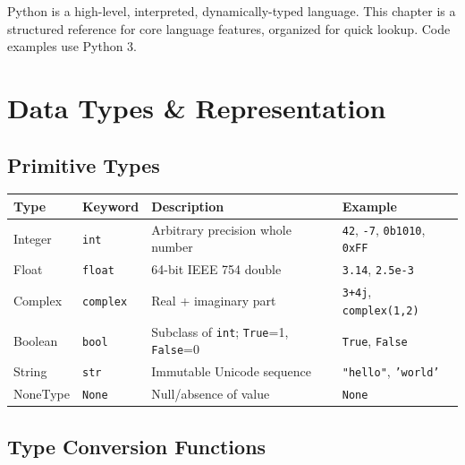 \documentclass[oneside]{book}
\begin{document}
Python is a high-level, interpreted, dynamically-typed language. This chapter
is a structured reference for core language features, organized for quick
lookup. Code examples use Python 3.

\section{Data Types \& Representation}

\subsection*{Primitive Types}

\begin{center}
\begin{tabularx}{\linewidth}{llXl}
\toprule
\textbf{Type} & \textbf{Keyword} & \textbf{Description} & \textbf{Example} \\
\midrule
Integer    & \texttt{int}     & Arbitrary precision whole number       & \texttt{42}, \texttt{-7}, \texttt{0b1010}, \texttt{0xFF} \\
Float      & \texttt{float}   & 64-bit IEEE 754 double                 & \texttt{3.14}, \texttt{2.5e-3} \\
Complex    & \texttt{complex} & Real + imaginary part                  & \texttt{3+4j}, \texttt{complex(1,2)} \\
Boolean    & \texttt{bool}    & Subclass of \texttt{int}; \texttt{True}=1, \texttt{False}=0 & \texttt{True}, \texttt{False} \\
String     & \texttt{str}     & Immutable Unicode sequence             & \texttt{"hello"}, \texttt{'world'} \\
NoneType   & \texttt{None}    & Null/absence of value                  & \texttt{None} \\
\bottomrule
\end{tabularx}
\end{center}


\subsection*{Type Conversion Functions}
\end{document}
